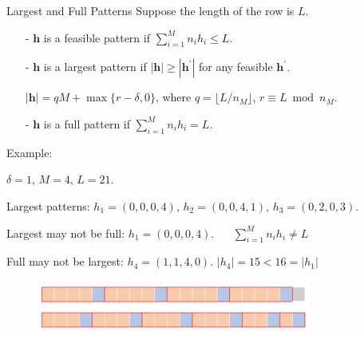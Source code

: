   \begin{frame}{Largest and Full Patterns}
    Suppose the length of the row is $L$.
    \begin{itemize}
      \item[-] $\bm{h}$ is a feasible pattern if $\sum_{i=1}^{M} n_i h_i \leq L$.
      \item[-] $\bm{h}$ is a largest pattern if $|\bm{h}| \geq |\bm{h}^{\prime}|$ for any feasible $\bm{h}^{\prime}$.
      
      $|\bm{h}| = qM + \max\{r-\delta, 0\}$, where $q = \lfloor L/n_M \rfloor$, $r \equiv L \bmod n_M$.
      \item[-] $\bm{h}$ is a full pattern if $\sum_{i=1}^{M} n_i h_i = L$.  
    \end{itemize}

     {\color{green} Example}: 
      
      $\delta = 1$, $M =4$, $L = 21$.
      
      Largest patterns: $h_1 = (0, 0, 0, 4)$, $h_2 = (0, 0, 4, 1)$, $h_3 = (0, 2, 0, 3)$.

      Largest may not be full: $h_1 = (0, 0, 0, 4)$. {\color{red} $\quad$ $\sum_{i=1}^{M} n_i h_i \neq L$}

      Full may not be largest: $h_4 = (1, 1, 4, 0)$. {\color{red} $|h_4| = 15 < 16 = |h_1|$}

      \begin{figure}[ht]
        \centering
        \includegraphics[width = 0.8\textwidth]{./images/full_largest.png}
      \end{figure}
  \end{frame}